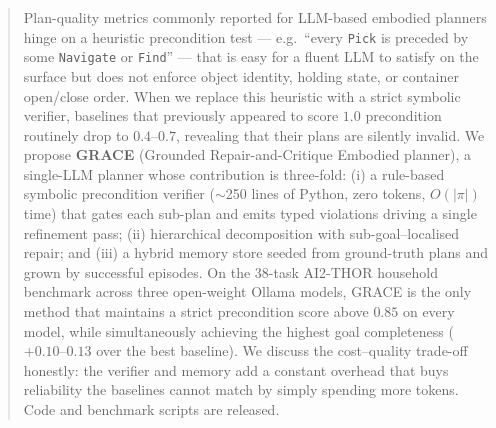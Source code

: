 
\begin{abstract}
Plan-quality metrics commonly reported for LLM-based embodied
planners hinge on a heuristic precondition test --- e.g.\ ``every
\texttt{Pick} is preceded by some \texttt{Navigate} or \texttt{Find}''
--- that is easy for a fluent LLM to satisfy on the surface but does
not enforce object identity, holding state, or container open/close
order. When we replace this heuristic with a strict symbolic
verifier, baselines that previously appeared to score $1.0$
precondition routinely drop to $0.4$--$0.7$, revealing that their
plans are silently invalid. We propose \textbf{GRACE} (Grounded
Repair-and-Critique Embodied planner), a single-LLM planner whose
contribution is three-fold: (i) a rule-based symbolic precondition
verifier ($\sim$250 lines of Python, zero tokens, $O(|\pi|)$ time)
that gates each sub-plan and emits typed violations driving a single
refinement pass; (ii) hierarchical decomposition with
sub-goal--localised repair; and (iii) a hybrid memory store seeded
from ground-truth plans and grown by successful episodes. On the
38-task AI2-THOR household benchmark across three open-weight Ollama
models, GRACE is the only method that maintains a strict
precondition score above $0.85$ on every model, while simultaneously
achieving the highest goal completeness ($+0.10$--$0.13$ over the
best baseline). We discuss the cost--quality trade-off honestly: the
verifier and memory add a constant overhead that buys reliability the
baselines cannot match by simply spending more tokens. Code and
benchmark scripts are released.
\end{abstract}
